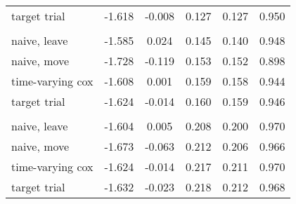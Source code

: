 \begin{tabular}{lccccc}
    \hspace{1em}target trial & -1.618 & -0.008 & 0.127 & 0.127 & 0.950\\
    \addlinespace[0.3em]
    \multicolumn{6}{l}{\textit{$VE_\lambda$ = 80\% and $\mu = 9$}}\\
    \hspace{1em}naive, leave & -1.585 & 0.024 & 0.145 & 0.140 & 0.948\\
    \hspace{1em}naive, move & -1.728 & -0.119 & 0.153 & 0.152 & 0.898\\
    \hspace{1em}time-varying cox & -1.608 & 0.001 & 0.159 & 0.158 & 0.944\\
    \hspace{1em}target trial & -1.624 & -0.014 & 0.160 & 0.159 & 0.946\\
    \addlinespace[0.3em]
    \multicolumn{6}{l}{\textit{$VE_\lambda$ = 80\% and $\mu = 15$}}\\
    \hspace{1em}naive, leave & -1.604 & 0.005 & 0.208 & 0.200 & 0.970\\
    \hspace{1em}naive, move & -1.673 & -0.063 & 0.212 & 0.206 & 0.966\\
    \hspace{1em}time-varying cox & -1.624 & -0.014 & 0.217 & 0.211 & 0.970\\
    \hspace{1em}target trial & -1.632 & -0.023 & 0.218 & 0.212 & 0.968\\
    \bottomrule
    \end{tabular}
